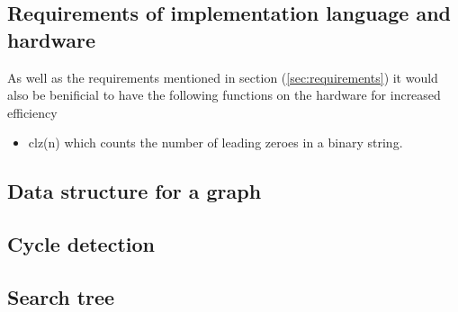 \documentclass[a4paper]{article}
\begin{document}
\subsection{Requirements of implementation language and hardware}
As well as the requirements mentioned in section (\ref{sec:requirements}) it would also be benificial to have the following functions on the hardware for increased efficiency
\begin{itemize}
\item clz(n) which counts the number of leading zeroes in a binary string.
\end{itemize}

\subsection{Data structure for a graph}

\subsection{Cycle detection}

\subsection{Search tree}
\end{document}
